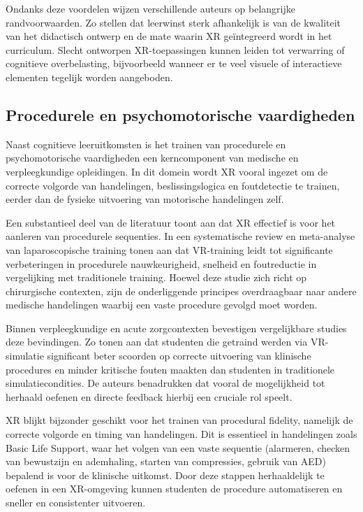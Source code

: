 Ondanks deze voordelen wijzen verschillende auteurs op belangrijke randvoorwaarden. Zo stellen \textcite{Radianti2020VRHE} dat leerwinst sterk afhankelijk is van de kwaliteit van het didactisch ontwerp en de mate waarin XR geïntegreerd wordt in het curriculum. Slecht ontworpen XR-toepassingen kunnen leiden tot verwarring of cognitieve overbelasting, bijvoorbeeld wanneer er te veel visuele of interactieve elementen tegelijk worden aangeboden.

\subsection{Procedurele en psychomotorische vaardigheden}

Naast cognitieve leeruitkomsten is het trainen van procedurele en psychomotorische vaardigheden een kerncomponent van medische en verpleegkundige opleidingen. In dit domein wordt XR vooral ingezet om de correcte volgorde van handelingen, beslissingslogica en foutdetectie te trainen, eerder dan de fysieke uitvoering van motorische handelingen zelf.

Een substantieel deel van de literatuur toont aan dat XR effectief is voor het aanleren van procedurele sequenties. In een systematische review en meta-analyse van laparoscopische training tonen \textcite{Alaker2016VR} aan dat VR-training leidt tot significante verbeteringen in procedurele nauwkeurigheid, snelheid en foutreductie in vergelijking met traditionele training. Hoewel deze studie zich richt op chirurgische contexten, zijn de onderliggende principes overdraagbaar naar andere medische handelingen waarbij een vaste procedure gevolgd moet worden.

Binnen verpleegkundige en acute zorgcontexten bevestigen vergelijkbare studies deze bevindingen. Zo tonen \textcite{Padilha2019VR} aan dat studenten die getraind werden via VR-simulatie significant beter scoorden op correcte uitvoering van klinische procedures en minder kritische fouten maakten dan studenten in traditionele simulatiecondities. De auteurs benadrukken dat vooral de mogelijkheid tot herhaald oefenen en directe feedback hierbij een cruciale rol speelt.

XR blijkt bijzonder geschikt voor het trainen van procedural fidelity, namelijk de correcte volgorde en timing van handelingen. Dit is essentieel in handelingen zoals Basic Life Support, waar het volgen van een vaste sequentie (alarmeren, checken van bewustzijn en ademhaling, starten van compressies, gebruik van AED) bepalend is voor de klinische uitkomst. Door deze stappen herhaaldelijk te oefenen in een XR-omgeving kunnen studenten de procedure automatiseren en sneller en consistenter uitvoeren.

